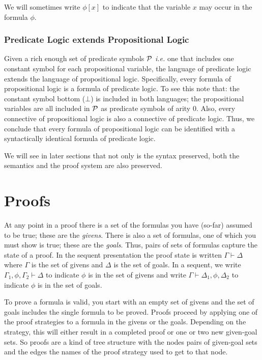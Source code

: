 \documentclass[11pt]{article}
\begin{document}
We will sometimes write $\phi[x]$ to indicate that the variable $x$ may occur
in the formula $\phi$.

\subsubsection{Predicate Logic extends Propositional Logic}

Given a rich enough set of predicate symbols
${\cal{P}}$ {\em{i.e.}}  one that includes one constant symbol for each
propositional variable, the language of predicate logic extends the language of
propositional logic.  Specifically, every formula of propositional logic is a
formula of predicate logic.  To see this note that: the constant symbol bottom
($\bot$) is included in both languages; the propositional variables are all
included in ${\cal{P}}$ as predicate symbols of arity 0. Also, every connective
of propositional logic is also a connective of predicate logic.  Thus, we
conclude that every formula of propositional logic can be identified with a
syntactically identical formula of predicate logic.

We will see in later sections that not only is the syntax preserved,
both the semantics and the proof system are also preserved.




\section{Proofs}

At any point in a proof there is a set of the formulas you have (so-far)
assumed to be true; these are the {\em{givens}}. There is also a set of
formulas, one of which you must show is true; these are the {\em{goals}}.
Thus, pairs of sets of formulas capture the state of a proof.  In the sequent
presentation the proof state is written $\Gamma\vdash\Delta$ where $\Gamma$ is
the set of givens and $\Delta$ is the set of goals.  In a sequent, we write
$\Gamma_1,\phi,\Gamma_2\vdash\Delta$ to indicate $\phi$ is in the set of givens
and write $\Gamma\vdash\Delta_1,\phi,\Delta_2$ to indicate $\phi$ is in the set
of goals.

To prove a formula is valid, you start with an empty set of givens and the set
of goals includes the single formula to be proved.  Proofs proceed by applying
one of the proof strategies to a formula in the givens or the goals. Depending
on the strategy, this will either result in a completed proof or one or two new
given-goal sets.  So proofs are a kind of tree structure with the nodes pairs
of given-goal sets and the edges the names of the proof strategy used to get to
that node.
\end{document}
